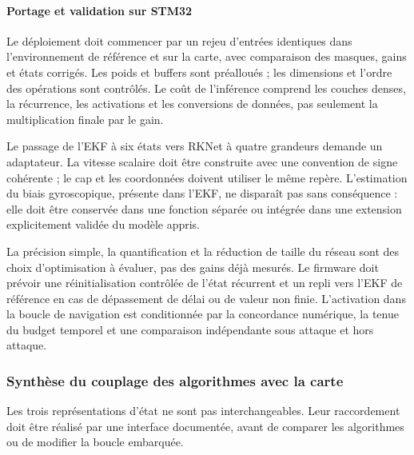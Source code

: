 \paragraph{Portage et validation sur STM32}
Le déploiement doit commencer par un rejeu d'entrées identiques dans l'environnement de référence et sur la carte, avec comparaison des masques, gains et états corrigés. Les poids et buffers sont préalloués ; les dimensions et l'ordre des opérations sont contrôlés. Le coût de l'inférence comprend les couches denses, la récurrence, les activations et les conversions de données, pas seulement la multiplication finale par le gain.

Le passage de l'EKF à six états vers RKNet à quatre grandeurs demande un adaptateur. La vitesse scalaire doit être construite avec une convention de signe cohérente ; le cap et les coordonnées doivent utiliser le même repère. L'estimation du biais gyroscopique, présente dans l'EKF, ne disparaît pas sans conséquence : elle doit être conservée dans une fonction séparée ou intégrée dans une extension explicitement validée du modèle appris.

La précision simple, la quantification et la réduction de taille du réseau sont des choix d'optimisation à évaluer, pas des gains déjà mesurés. Le firmware doit prévoir une réinitialisation contrôlée de l'état récurrent et un repli vers l'EKF de référence en cas de dépassement de délai ou de valeur non finie. L'activation dans la boucle de navigation est conditionnée par la concordance numérique, la tenue du budget temporel et une comparaison indépendante sous attaque et hors attaque.
\FloatBarrier

\subsubsection{Synthèse du couplage des algorithmes avec la carte}

Les trois représentations d'état ne sont pas interchangeables. Leur raccordement doit être réalisé par une interface documentée, avant de comparer les algorithmes ou de modifier la boucle embarquée.

